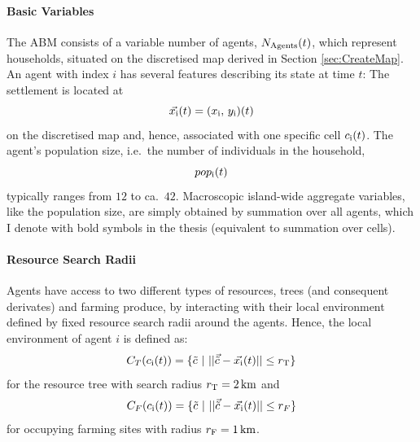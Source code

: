 \paragraph{Basic Variables}
The ABM consists of a variable number of agents, $N_{\rm Agents}(t)$, which represent households, situated on the discretised map derived in Section \ref{sec:CreateMap}.
An agent with index $i$ has several features describing its state at time $t$:
The settlement is located at 
\begin{equation}
	\vec{x_{\rm i}}(t) = (x_{\rm i},\, y_{\rm i})(t)
\end{equation}
 on the discretised map and, hence, associated with one specific cell $c_{\rm i}(t)$.
 The agent's population size, i.e.\ the number of individuals in the household, 
 \begin{equation}pop_{\rm i}(t) \end{equation}
typically ranges from $12$ to ca.\ $42$. %
Macroscopic island-wide aggregate variables, like the population size, are simply obtained by summation over all agents, which I denote with bold symbols in the thesis (equivalent to summation over cells). 

\paragraph{Resource Search Radii}
Agents have access to two different types of resources, trees (and consequent derivates) and farming produce, by interacting with their local environment defined by fixed resource search radii around the agents.
Hence, the local environment of agent $i$ is defined as:
\begin{equation} \label{eq:Circle_T}
C_{T}(c_{\rm i}(t)) = \{ \tilde{c}\ | \   | |  \vec{\tilde{c}} - \vec{x_{\rm i}}(t) | |  \leq r_{\rm T} \} 
\end{equation}
for the resource tree with search radius $r_{\rm T} =2\, {\rm km}$ and 
\begin{equation} \label{eq:Circle_F}
C_{F}(c_{\rm i}(t)) = \{ \tilde{c}\ | \   | |  \vec{\tilde{c}} - \vec{x_{\rm i}}(t) | |  \leq r_{F} \}
\end{equation}
for occupying farming sites with radius $r_{\rm F} = 1\, {\rm km}$.

